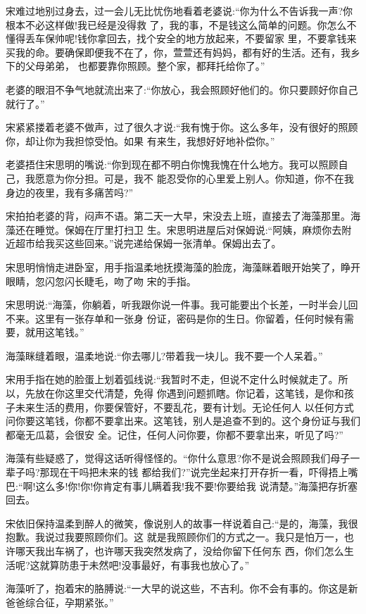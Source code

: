 \documentclass[11pt,a4paper,onecolumn]{article}
\begin{document}
宋难过地别过身去，过一会儿无比忧伤地看着老婆说:``你为什么不告诉我一声?你根本不必这样做!我已经是没得救
了，我的事，不是钱这么简单的问题。你怎么不懂得丢车保帅呢!钱你拿回去，找个安全的地方放起来，不要留家
里，不要拿钱来买我的命。要确保即便我不在了，你，萱萱还有妈妈，都有好的生活。还有，我乡下的父母弟弟，
也都要靠你照顾。整个家，都拜托给你了。''

老婆的眼泪不争气地就流出来了:``你放心，我会照顾好他们的。你只要顾好你自己就行了。''

宋紧紧搂着老婆不做声，过了很久才说:``我有愧于你。这么多年，没有很好的照顾你，却让你为我担惊受怕。如果
有来生，我想好好地补偿你。''

老婆捂住宋思明的嘴说:``你到现在都不明白你愧我愧在什么地方。我可以照顾自己，我愿意为你分担。可是，我不
能忍受你的心里爱上别人。你知道，你不在我身边的夜里，我有多痛苦吗?''

宋拍拍老婆的背，闷声不语。第二天一大早，宋没去上班，直接去了海藻那里。海藻还在睡觉。保姆在厅里打扫卫
生。宋思明进屋后对保姆说:``阿姨，麻烦你去附近超市给我买这些回来。''说完递给保姆一张清单。保姆出去了。

宋思明悄悄走进卧室，用手指温柔地抚摸海藻的脸庞，海藻眯着眼开始笑了，睁开眼睛，忽闪忽闪长睫毛，吻了吻
宋的手指。

宋思明说:``海藻，你躺着，听我跟你说一件事。我可能要出个长差，一时半会儿回不来。这里有一张存单和一张身
份证，密码是你的生日。你留着，任何时候有需要，就用这笔钱。''

海藻眯缝着眼，温柔地说:``你去哪儿?带着我一块儿。我不要一个人呆着。''

宋用手指在她的脸蛋上划着弧线说:``我暂时不走，但说不定什么时候就走了。所以，先放在你这里交代清楚，免得
你遇到问题抓瞎。你记着，这笔钱，是你和孩子未来生活的费用，你要保管好，不要乱花，要有计划。无论任何人
以任何方式问你要这笔钱，你都不要拿出来。这笔钱，别人是追查不到的。这个身份证与我们都毫无瓜葛，会很安
全。记住，任何人问你要，你都不要拿出来，听见了吗?''

海藻有些疑惑了，觉得这话听得怪怪的。``你什么意思?你不是说会照顾我们母子一辈子吗?那现在干吗把未来的钱
都给我们?''说完坐起来打开存折一看，吓得捂上嘴巴:``啊!这么多!你!你!你肯定有事儿瞒着我!我不要!你要给我
说清楚。''海藻把存折塞回去。

宋依旧保持温柔到醉人的微笑，像说别人的故事一样说着自己:``是的，海藻，我很抱歉。我说过我要照顾你们。这
就是我照顾你们的方式之一。我只是怕万一，也许哪天我出车祸了，也许哪天我突然发病了，没给你留下任何东
西，你们怎么生活呢?这就算防患于未然吧!没事最好，有事我也放心了。''

海藻听了，抱着宋的胳膊说:``一大早的说这些，不吉利。你不会有事的。你这是新爸爸综合征，孕期紧张。''
\end{document}
